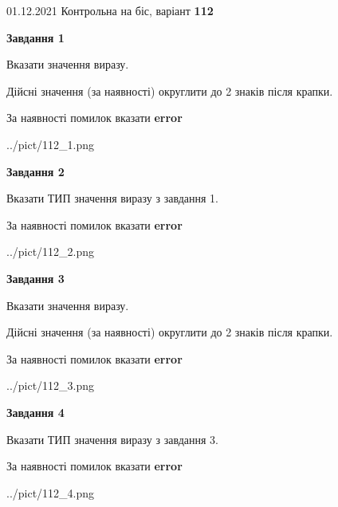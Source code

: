 \documentclass[11pt, ukrainian]{article}
\begin{document}
{01.12.2021 Контрольна на біс, варіант  \No \textbf { 112 }\par}
{
\begin {large}
{\begin {center}\textbf{Завдання 1}\end {center}}\par
Вказати значення виразу. \par
Дійсні значення (за наявності) округлити до 2 знаків після крапки. \par
За наявності помилок вказати \textbf{error}

\begin{center}
	{../pict/112_1.png}
\end{center}
\newpage

{\begin {center}\textbf{Завдання 2}\end {center}}\par
Вказати ТИП значення виразу з завдання 1. \par
За наявності помилок вказати \textbf{error}

\begin{center}
	{../pict/112_2.png}
\end{center}
\newpage

{\begin {center}\textbf{Завдання 3}\end {center}}\par
Вказати значення виразу. \par
Дійсні значення (за наявності) округлити до 2 знаків після крапки. \par
За наявності помилок вказати \textbf{error}

\begin{center}
	{../pict/112_3.png}
\end{center}
\newpage

{\begin {center}\textbf{Завдання 4}\end {center}}\par
Вказати ТИП значення виразу з завдання 3. \par
За наявності помилок вказати \textbf{error}

\begin{center}
	{../pict/112_4.png}
\end{center}
\newpage


\end{large}}
\end{document}

